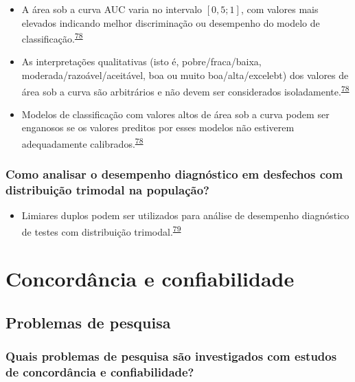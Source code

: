 \documentclass[
]{book}
\providecommand{\tightlist}{%
  \setlength{\itemsep}{0pt}\setlength{\parskip}{0pt}}
\begin{document}
\begin{itemize}
\item
  A área sob a curva AUC varia no intervalo \([0,5; 1]\), com valores mais elevados indicando melhor discriminação ou desempenho do modelo de classificação.\textsuperscript{\protect\hyperlink{ref-de2022}{78}}
\item
  As interpretações qualitativas (isto é, pobre/fraca/baixa, moderada/razoável/aceitável, boa ou muito boa/alta/excelebt) dos valores de área sob a curva são arbitrários e não devem ser considerados isoladamente.\textsuperscript{\protect\hyperlink{ref-de2022}{78}}
\item
  Modelos de classificação com valores altos de área sob a curva podem ser enganosos se os valores preditos por esses modelos não estiverem adequadamente calibrados.\textsuperscript{\protect\hyperlink{ref-de2022}{78}}
\end{itemize}

\hypertarget{como-analisar-o-desempenho-diagnuxf3stico-em-desfechos-com-distribuiuxe7uxe3o-trimodal-na-populauxe7uxe3o}{%
\subsection{Como analisar o desempenho diagnóstico em desfechos com distribuição trimodal na população?}\label{como-analisar-o-desempenho-diagnuxf3stico-em-desfechos-com-distribuiuxe7uxe3o-trimodal-na-populauxe7uxe3o}}

\begin{itemize}
\tightlist
\item
  Limiares duplos podem ser utilizados para análise de desempenho diagnóstico de testes com distribuição trimodal.\textsuperscript{\protect\hyperlink{ref-ferreira2021}{79}}
\end{itemize}

\hypertarget{analise-concordancia-confiabilidade}{%
\chapter{\texorpdfstring{\textbf{Concordância e confiabilidade}}{Concordância e confiabilidade}}\label{analise-concordancia-confiabilidade}}

\hypertarget{problemas}{%
\section{Problemas de pesquisa}\label{problemas}}

\hypertarget{quais-problemas-de-pesquisa-suxe3o-investigados-com-estudos-de-concorduxe2ncia-e-confiabilidade}{%
\subsection{Quais problemas de pesquisa são investigados com estudos de concordância e confiabilidade?}\label{quais-problemas-de-pesquisa-suxe3o-investigados-com-estudos-de-concorduxe2ncia-e-confiabilidade}}
\end{document}
